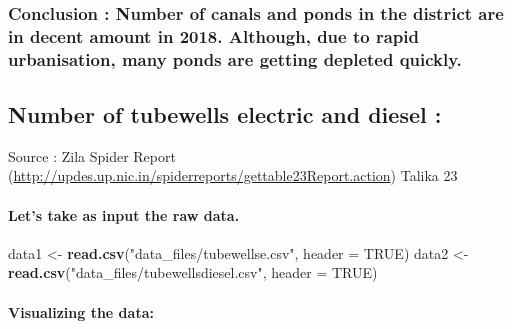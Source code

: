 \documentclass[]{article}
\newenvironment{Shaded}{\begin{snugshade}}{\end{snugshade}}
\newcommand{\KeywordTok}[1]{\textcolor[rgb]{0.13,0.29,0.53}{\textbf{#1}}}
\newcommand{\DataTypeTok}[1]{\textcolor[rgb]{0.13,0.29,0.53}{#1}}
\newcommand{\StringTok}[1]{\textcolor[rgb]{0.31,0.60,0.02}{#1}}
\newcommand{\OtherTok}[1]{\textcolor[rgb]{0.56,0.35,0.01}{#1}}
\newcommand{\NormalTok}[1]{#1}
\let\oldparagraph\paragraph
\renewcommand{\paragraph}[1]{\oldparagraph{#1}\mbox{}}
\begin{document}
\subsubsection{\texorpdfstring{\textbf{Conclusion} : Number of canals
and ponds in the district are in decent amount in 2018. Although, due to
rapid urbanisation, many ponds are getting depleted
quickly.}{Conclusion : Number of canals and ponds in the district are in decent amount in 2018. Although, due to rapid urbanisation, many ponds are getting depleted quickly.}}\label{conclusion-number-of-canals-and-ponds-in-the-district-are-in-decent-amount-in-2018.-although-due-to-rapid-urbanisation-many-ponds-are-getting-depleted-quickly.}

\subsection{Number of tubewells electric and diesel
:}\label{number-of-tubewells-electric-and-diesel}

Source : Zila Spider Report
(\url{http://updes.up.nic.in/spiderreports/gettable23Report.action})
Talika 23

\paragraph{Let's take as input the raw
data.}\label{lets-take-as-input-the-raw-data.-8}

\begin{Shaded}
\begin{Highlighting}[]
\NormalTok{data1 <-}\StringTok{ }\KeywordTok{read.csv}\NormalTok{(}\StringTok{"data_files/tubewellse.csv"}\NormalTok{, }\DataTypeTok{header =} \OtherTok{TRUE}\NormalTok{)}
\NormalTok{data2 <-}\StringTok{ }\KeywordTok{read.csv}\NormalTok{(}\StringTok{"data_files/tubewellsdiesel.csv"}\NormalTok{, }\DataTypeTok{header =} \OtherTok{TRUE}\NormalTok{)}
\end{Highlighting}
\end{Shaded}

\paragraph{Visualizing the data:}\label{visualizing-the-data-8}
\end{document}

